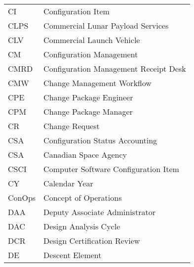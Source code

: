 \begin{longtable}{ll}
    CI &                                 Configuration Item \\  
 
  CLPS &                  Commercial Lunar Payload Services \\  
 
   CLV &                          Commercial Launch Vehicle \\  
 
    CM &                           Configuration Management \\  
 
  CMRD &              Configuration Management Receipt Desk \\  
 
   CMW &                         Change Management Workflow \\  
 
   CPE &                            Change Package Engineer \\  
 
   CPM &                             Change Package Manager \\  
 
    CR &                                     Change Request \\  
 
   CSA &                    Configuration Status Accounting \\  
 
   CSA &                              Canadian Space Agency \\  
 
  CSCI &               Computer Software Configuration Item \\  
 
    CY &                                      Calendar Year \\  
 
ConOps &                              Concept of Operations \\  
 
   DAA &                     Deputy Associate Administrator \\  
 
   DAC &                              Design Analysis Cycle \\  
 
   DCR &                        Design Certification Review \\  
 
    DE &                                    Descent Element \\  
 

\end{longtable}
